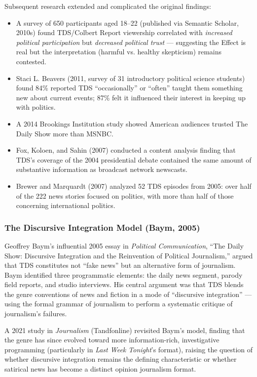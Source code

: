 \documentclass[11pt,letterpaper]{article}
\begin{document}
Subsequent research extended and complicated the original findings:

\begin{itemize}[leftmargin=*]
  \item A survey of 650 participants aged 18--22 (published via Semantic Scholar, 2010s) found TDS/Colbert Report viewership correlated with \textit{increased political participation} but \textit{decreased political trust} --- suggesting the Effect is real but the interpretation (harmful vs. healthy skepticism) remains contested.
  \item Staci L. Beavers (2011, survey of 31 introductory political science students) found 84\% reported TDS ``occasionally'' or ``often'' taught them something new about current events; 87\% felt it influenced their interest in keeping up with politics.
  \item A 2014 Brookings Institution study showed American audiences trusted The Daily Show more than MSNBC.
  \item Fox, Koloen, and Sahin (2007) conducted a content analysis finding that TDS's coverage of the 2004 presidential debate contained the same amount of substantive information as broadcast network newscasts.
  \item Brewer and Marquardt (2007) analyzed 52 TDS episodes from 2005: over half of the 222 news stories focused on politics, with more than half of those concerning international politics.
\end{itemize}

\subsubsection{The Discursive Integration Model (Baym, 2005)}

Geoffrey Baym's influential 2005 essay in \textit{Political Communication}, ``The Daily Show: Discursive Integration and the Reinvention of Political Journalism,'' argued that TDS constitutes not ``fake news'' but an alternative form of journalism. Baym identified three programmatic elements: the daily news segment, parody field reports, and studio interviews. His central argument was that TDS blends the genre conventions of news and fiction in a mode of ``discursive integration'' --- using the formal grammar of journalism to perform a systematic critique of journalism's failures.

A 2021 study in \textit{Journalism} (Tandfonline) revisited Baym's model, finding that the genre has since evolved toward more information-rich, investigative programming (particularly in \textit{Last Week Tonight}'s format), raising the question of whether discursive integration remains the defining characteristic or whether satirical news has become a distinct opinion journalism format.
\end{document}

